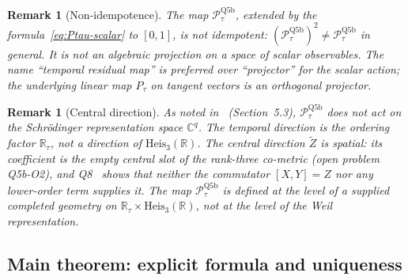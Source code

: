 \documentclass[11pt,a4paper]{article}
\newtheorem{remark}[theorem]{Remark}
\begin{document}
      \begin{remark}[Non-idempotence]\label{rem:nonidempotent}
        The map $\mathcal{P}_\tau^{\mathrm{Q5b}}$, extended by the formula~\eqref{eq:Ptau-scalar} to $[0,1]$, is
        \emph{not} idempotent:
        $(\mathcal{P}_\tau^{\mathrm{Q5b}})^2 \neq \mathcal{P}_\tau^{\mathrm{Q5b}}$ in general.
        It is not an algebraic projection on a space of scalar observables.
        The name ``temporal residual map'' is preferred over ``projector'' for
        the scalar action; the underlying linear map $P_\tau$ on tangent vectors is an
        orthogonal projector.
      \end{remark}

      \begin{remark}[Central direction]\label{rem:central}
        As noted in~\cite{Beau2026n} (Section~5.3), $\mathcal{P}_\tau^{\mathrm{Q5b}}$ does not act
        on the Schr\"odinger representation space $\mathbb{C}^q$.
        The temporal direction is the ordering factor $\mathbb{R}_\tau$, not a direction of
        $\mathrm{Heis}_3(\mathbb{R})$.
        The central direction $\tilde{Z}$ is spatial: its coefficient is the empty central slot of the rank-three
        co-metric (open problem Q5b-O2), and Q8~\cite{BeauQ8} shows that neither the commutator $[X,Y]=Z$ nor any
        lower-order term supplies it.
        The map $\mathcal{P}_\tau^{\mathrm{Q5b}}$ is defined at the level of a supplied completed
        geometry on $\mathbb{R}_\tau\times\mathrm{Heis}_3(\mathbb{R})$, not at the level of
        the Weil representation.
      \end{remark}

    \subsection{Main theorem: explicit formula and uniqueness}
\end{document}
